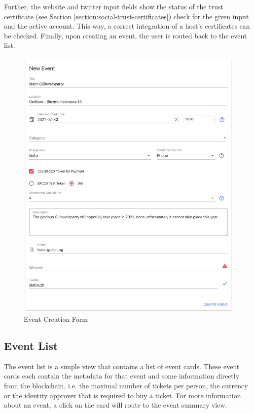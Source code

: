 Further, the website and twitter input fields show the status of the trust certificate (see Section \ref{section:social-trust-certificates}) check for the given input and the active account. This way, a correct integration of a host's certificates can be checked. Finally, upon creating an event, the user is routed back to the event list.

\begin{figure}[H]
    \centering
    \includegraphics[width=15cm]{images/host-event-form.png}
    \caption{Event Creation Form \protect}
    \label{img:host-event-form}
\end{figure}

\subsection{Event List}
The event list is a simple view that contains a list of event cards. These event cards each contain the metadata for that event and some information directly from the blockchain, i.e. the maximal number of tickets per person, the currency or the identity approver that is required to buy a ticket. For more information about an event, a click on the card will route to the event summary view.

